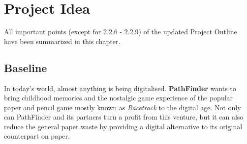 \chapter{Project Idea}
	All important points (except for 2.2.6 - 2.2.9) of the updated Project Outline have been summarized in this chapter.

\section{Baseline}
	In today's world, almost anything is being digitalised. \textbf{PathFinder} wants to bring childhood memories and the nostalgic game experience of the popular paper and pencil game mostly known as \textit{Racetrack} to the digital age. Not only can PathFinder and its partners turn a profit from this venture, but it can also reduce the general paper waste by providing a digital alternative to its original counterpart on paper.